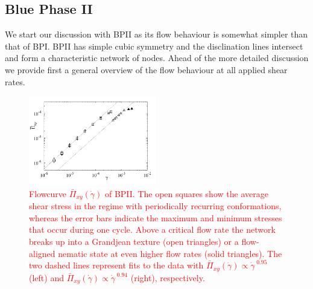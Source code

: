 \documentclass[8.5pt,twoside,twocolumn]{article}
\newcommand{\gd}{\dot{\gamma}}
\newcommand{\rev}[1]{{\textcolor{red}{#1}}}
\begin{document}
\subsection{Blue Phase II}

We start our discussion with BPII as its flow behaviour is somewhat simpler 
than that of BPI. BPII has simple cubic symmetry and the disclination lines 
intersect and form a characteristic network of nodes.
Ahead of the more detailed discussion we provide first a general overview of the 
flow behaviour at all applied shear rates.

\begin{figure}[htpb]
\includegraphics[width=0.495\textwidth]{flowcurve_bp2.pdf}
\caption{
\rev{
Flowcurve $\bar{\Pi}_{xy}(\gd)$ of BPII. The open squares show the average shear stress in the regime with periodically recurring conformations,
whereas the error bars indicate the maximum and minimum stresses that occur during one cycle. Above a critical flow rate the network  
breaks up into a Grandjean texture (open triangles) or a flow-aligned nematic state at even higher flow rates (solid triangles).
The two dashed lines represent fits to the data with $\bar{\Pi}_{xy}(\gd)\propto \gd^{\;0.95}$ (left) and $\bar{\Pi}_{xy}(\gd)\propto \gd^{\;0.94}$ (right), respectively.
}
}
\label{bp2-flowcurve}
\end{figure}
\end{document}
